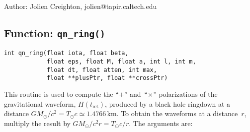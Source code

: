 \clearpage
{}

\begin{description}
\item{Author:} Jolien Creighton, jolien@tapir.caltech.edu
\end{description}


\clearpage
\subsection{Function: \texttt{qn\_ring()}}

\begin{verbatim}
int qn_ring(float iota, float beta,
            float eps, float M, float a, int l, int m,
            float dt, float atten, int max,
            float **plusPtr, float **crossPtr)
\end{verbatim}
This routine is used to compute the ``$+$'' and~``$\times$'' polarizations
of the gravitational waveform, $H(t_{\mathrm{\scriptstyle ret}})$, produced by
a black hole ringdown at a distance
$GM_\odot/c^2=T_\odot c\simeq1.4766\,{\mathrm{km}}$.  To obtain the waveforms
at a distance~$r$, multiply the result by $GM_\odot/c^2r=T_\odot c/r$.
The arguments are:
